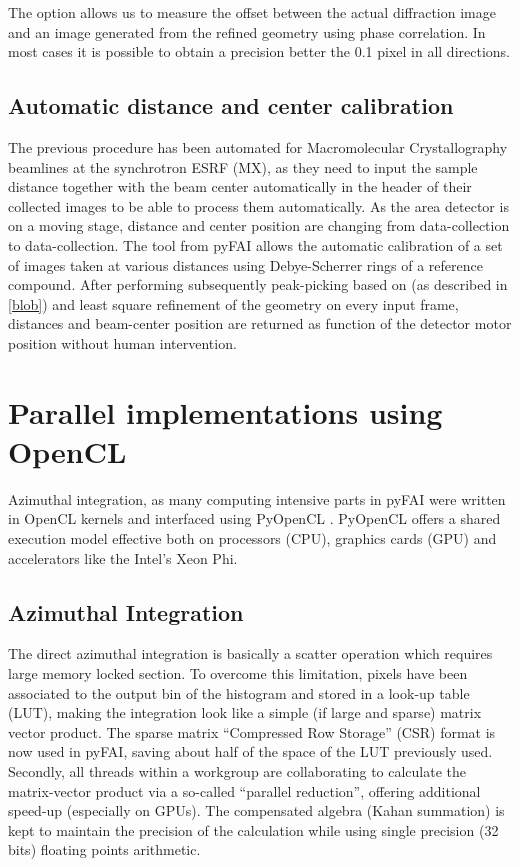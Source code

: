 \documentclass[preprint]{iucr}
\begin{document}
The  option allows us to measure the offset between the actual
diffraction image and an image generated from the refined geometry using phase
correlation. In most cases it is possible to obtain a precision better the 0.1
pixel in all directions.

\subsection{Automatic distance and center calibration}
The previous procedure has been automated for Macromolecular Crystallography
beamlines at the synchrotron ESRF (MX), as they need to input the sample
distance together  with the beam center automatically in the header of their
collected images to be able to process them automatically. 
As the area detector is on a moving stage, distance and center position are
changing from data-collection to data-collection.
The  tool from pyFAI allows the automatic calibration of
a set of images taken at various distances using Debye-Scherrer rings of a
reference compound.
After performing subsequently peak-picking based on 
(as described in \ref{blob}) and least square refinement of the geometry on
every input frame, distances and beam-center position are returned as function
of the detector motor position without human intervention.

\section{Parallel implementations using OpenCL}
Azimuthal integration, as  many computing intensive parts in pyFAI were written
in OpenCL kernels and interfaced using PyOpenCL \cite{pyopencl}. PyOpenCL offers a
shared execution model effective both on processors (CPU), graphics cards (GPU)
and accelerators like the Intel's Xeon Phi.

\subsection{Azimuthal Integration}
The direct azimuthal integration is basically a scatter operation which
requires large memory locked section.
To overcome this limitation, pixels have been
associated to the output bin of the histogram and stored in a look-up
table (LUT), making the integration look like a simple (if large and sparse)
matrix vector product.
The sparse matrix ``Compressed Row Storage'' (CSR) format is now used in pyFAI,
saving about half of the space of the LUT previously used.
Secondly, all threads within a workgroup are collaborating to calculate the
matrix-vector product via a so-called ``parallel reduction'', offering
additional speed-up (especially on GPUs).
The compensated algebra (Kahan summation) is kept to maintain the precision
of the calculation while using single precision (32 bits) floating points
arithmetic. 
\end{document}
